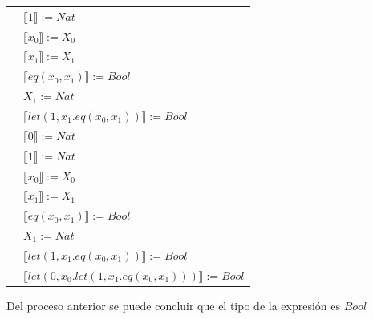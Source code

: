 \begin{exercise}
\begin{description}
\begin{center}
\begin{longtable}{ | l | l | }
                        & $ \llbracket 1 \rrbracket := Nat$ \\
                        & $ \llbracket x_0 \rrbracket := X_0$ \\
                        & $ \llbracket x_1 \rrbracket := X_1$ \\
                        & $ \llbracket eq(x_0,x_1) \rrbracket := Bool$ \\
                        & $X_1 := Nat$ \\
                        & $ \llbracket let(1,x_1.eq(x_0,x_1)) \rrbracket := Bool$ \\
                      \hline
                        & $ \llbracket 0 \rrbracket := Nat$ \\
                        & $ \llbracket 1 \rrbracket := Nat$  \\
                        & $ \llbracket x_0 \rrbracket := X_0$ \\
                        & $ \llbracket x_1 \rrbracket := X_1$ \\
                        & $ \llbracket eq(x_0,x_1) \rrbracket := Bool$ \\
                        & $X_1 := Nat$ \\
                        & $ \llbracket let(1,x_1.eq(x_0,x_1)) \rrbracket := Bool$ \\
                        & $ \llbracket let(0,x_0.let(1,x_1.eq(x_0,x_1))) \rrbracket := Bool$ \\
		\hline
                    \end{longtable}
                \end{center}
        Del proceso anterior se puede concluir que el tipo de la expresión es $Bool$
        \end{description}
    \end{exercise}


